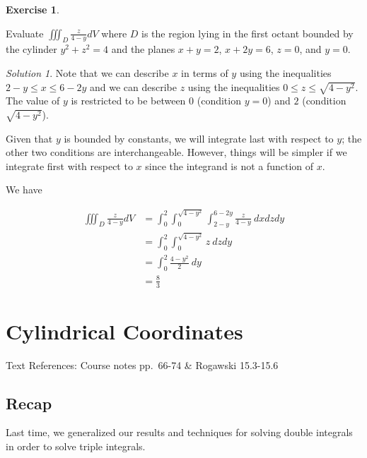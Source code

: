 \documentclass[
]{book}
\theoremstyle{definition}
\theoremstyle{definition}
\theoremstyle{definition}
\newtheorem{exercise}{Exercise}[chapter]
\theoremstyle{definition}
\theoremstyle{remark}
\newtheorem*{solution}{Solution}
\begin{document}
\begin{exercise}
\protect\hypertarget{exr:unlabeled-div-120}{}\label{exr:unlabeled-div-120}

Evaluate \(\displaystyle \iiint_D \frac{z}{4-y} dV\) where \(D\) is the region lying in the first octant bounded by the cylinder \(y^2+z^2=4\) and the planes \(x+y=2\), \(x+2y=6\), \(z=0\), and \(y=0\).

\end{exercise}

\begin{solution}

Note that we can describe \(x\) in terms of \(y\) using the inequalities \(2-y\leq x\leq 6-2y\) and we can describe \(z\) using the inequalities \(0\leq z\leq \sqrt{4-y^2}\). The value of \(y\) is restricted to be between \(0\) (condition \(y=0\)) and \(2\) (condition \(\sqrt{4-y^2}\)).

Given that \(y\) is bounded by constants, we will integrate last with respect to \(y\); the other two conditions are interchangeable. However, things will be simpler if we integrate first with respect to \(x\) since the integrand is not a function of \(x\).

We have

\begin{align*}
\iiint_D \frac{z}{4-y} dV & = \int_0^2 \int_{0}^{\sqrt{4-y^2}}\int_{2-y}^{6-2y} \frac{z}{4-y}~dxdzdy \\
&= \int_0^2 \int_{0}^{\sqrt{4-y^2}} z~dz dy\\
&= \int_0^2 \frac{4-y^2}{2}~dy\\
&= \frac{8}{3}
\end{align*}

\end{solution}

\hypertarget{lec-16}{%
\chapter{Cylindrical Coordinates}\label{lec-16}}

Text References: Course notes pp.~66-74 \& Rogawski 15.3-15.6

\hypertarget{recap-14}{%
\section{Recap}\label{recap-14}}

Last time, we generalized our results and techniques for solving double integrals in order to solve triple integrals.
\end{document}
